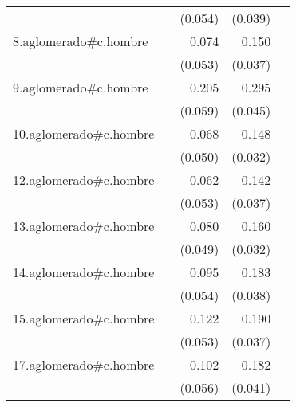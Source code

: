 {\begin{longtable}{l*{4}{D{.}{.}{-1}}}
            &                     &     (0.054)         &     (0.039)         &                     \\
\addlinespace
8.aglomerado#c.hombre&                     &       0.074         &       0.150\sym{***}&                     \\
            &                     &     (0.053)         &     (0.037)         &                     \\
\addlinespace
9.aglomerado#c.hombre&                     &       0.205\sym{***}&       0.295\sym{***}&                     \\
            &                     &     (0.059)         &     (0.045)         &                     \\
\addlinespace
10.aglomerado#c.hombre&                     &       0.068         &       0.148\sym{***}&                     \\
            &                     &     (0.050)         &     (0.032)         &                     \\
\addlinespace
12.aglomerado#c.hombre&                     &       0.062         &       0.142\sym{***}&                     \\
            &                     &     (0.053)         &     (0.037)         &                     \\
\addlinespace
13.aglomerado#c.hombre&                     &       0.080         &       0.160\sym{***}&                     \\
            &                     &     (0.049)         &     (0.032)         &                     \\
\addlinespace
14.aglomerado#c.hombre&                     &       0.095         &       0.183\sym{***}&                     \\
            &                     &     (0.054)         &     (0.038)         &                     \\
\addlinespace
15.aglomerado#c.hombre&                     &       0.122\sym{*}  &       0.190\sym{***}&                     \\
            &                     &     (0.053)         &     (0.037)         &                     \\
\addlinespace
17.aglomerado#c.hombre&                     &       0.102         &       0.182\sym{***}&                     \\
            &                     &     (0.056)         &     (0.041)         &                     \\

\end{longtable}}
